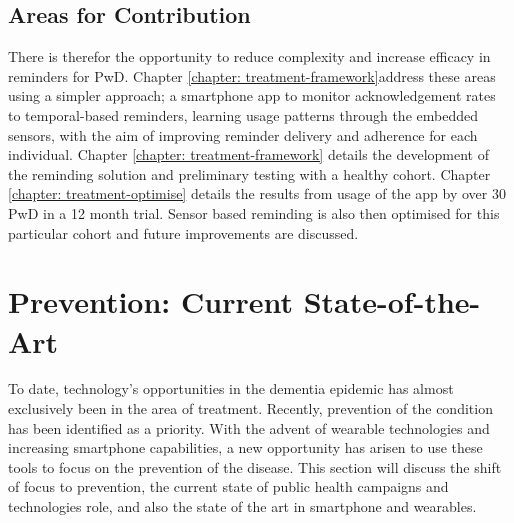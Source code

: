 \subsection{Areas for Contribution}
There is therefor the opportunity to reduce complexity and increase efficacy in reminders for PwD. Chapter \ref{chapter: treatment-framework}address these areas using a simpler approach; a smartphone app to monitor acknowledgement rates to temporal-based reminders, learning usage patterns through the embedded sensors, with the aim of improving reminder delivery and adherence for each individual. Chapter \ref{chapter: treatment-framework} details the development of the reminding solution and preliminary testing with a healthy cohort. Chapter \ref{chapter: treatment-optimise} details the results from usage of the app by over 30 PwD in a 12 month trial. Sensor based reminding is also then optimised for this particular cohort and future improvements are discussed.

\section{Prevention: Current State-of-the-Art}
To date, technology's opportunities in the dementia epidemic has almost exclusively been in the area of treatment. Recently, prevention of the condition has been identified as a priority. With the advent of wearable technologies and increasing smartphone capabilities, a new opportunity has arisen to use these tools to focus on the prevention of the disease.
This section will discuss the shift of focus to prevention, the current state of public health campaigns and technologies role, and also the state of the art in smartphone and wearables.

